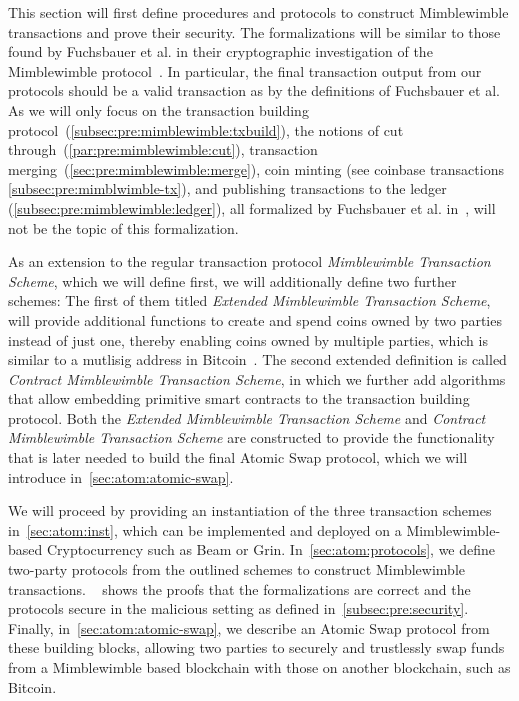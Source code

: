 This section will first define procedures and protocols to construct Mimblewimble transactions and prove their security.
The formalizations will be similar to those found by Fuchsbauer et al. in their cryptographic investigation of the Mimblewimble protocol~\cite{fuchsbauer2019aggregate}.
In particular, the final transaction output from our protocols should be a valid transaction as by the definitions of Fuchsbauer et al.
As we will only focus on the transaction building protocol~(\cref{subsec:pre:mimblewimble:txbuild}), the notions of cut through~(\cref{par:pre:mimblewimble:cut}), transaction merging~(\cref{sec:pre:mimblewimble:merge}), coin minting (see coinbase transactions \cref{subsec:pre:mimblwimble-tx}), and publishing transactions to the ledger (\cref{subsec:pre:mimblewimble:ledger}), all formalized by Fuchsbauer et al. in~\cite{fuchsbauer2019aggregate}, will not be the topic of this formalization.

As an extension to the regular transaction protocol \emph{Mimblewimble Transaction Scheme}, which we will define first, we will additionally define two further schemes:
The first of them titled \emph{Extended Mimblewimble Transaction Scheme}, will provide additional functions to create and spend coins owned by two parties instead of just one, thereby enabling coins owned by multiple parties, which is similar to a mutlisig address in Bitcoin~\cite{antonopoulos2014mastering}.
The second extended definition is called \emph{Contract Mimblewimble Transaction Scheme}, in which we further add algorithms that allow embedding primitive smart contracts to the transaction building protocol.
Both the \emph{Extended Mimblewimble Transaction Scheme} and \emph{Contract Mimblewimble Transaction Scheme} are constructed to provide the functionality that is later needed to build the final Atomic Swap protocol, which we will introduce in~\cref{sec:atom:atomic-swap}.

We will proceed by providing an instantiation of the three transaction schemes in~\cref{sec:atom:inst}, which can be implemented and deployed on a Mimblewimble-based Cryptocurrency such as Beam or Grin.
In~\cref{sec:atom:protocols}, we define two-party protocols from the outlined schemes to construct Mimblewimble transactions.
~ shows the proofs that the formalizations are correct and the protocols secure in the malicious setting as defined in~\cref{subsec:pre:security}.
Finally, in~\cref{sec:atom:atomic-swap}, we describe an Atomic Swap protocol from these building blocks, allowing two parties to securely and trustlessly swap funds from a Mimblewimble based blockchain with those on another blockchain, such as Bitcoin.

